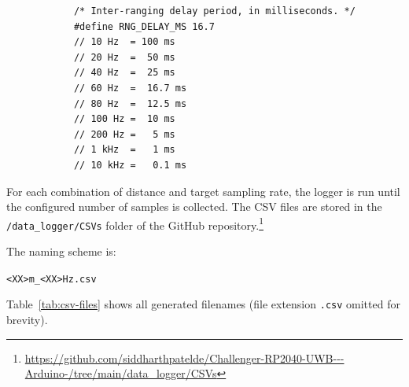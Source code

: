 \documentclass[a4paper,11pt]{article}
\begin{document}
	\begin{tcolorbox}[colback=black!2,
		sharp corners,
		boxrule=0.3pt]
		\begin{verbatim}
			/* Inter-ranging delay period, in milliseconds. */
			#define RNG_DELAY_MS 16.7
			// 10 Hz  = 100 ms
			// 20 Hz  =  50 ms
			// 40 Hz  =  25 ms
			// 60 Hz  =  16.7 ms
			// 80 Hz  =  12.5 ms
			// 100 Hz =  10 ms
			// 200 Hz =   5 ms
			// 1 kHz  =   1 ms
			// 10 kHz =   0.1 ms
		\end{verbatim}
	\end{tcolorbox}
	
	For each combination of distance and target sampling rate, the logger is run
	until the configured number of samples is collected. The CSV files are stored
	in the \texttt{/data\_logger/CSVs} folder of the GitHub repository.\footnote{\url{https://github.com/siddharthpatelde/Challenger-RP2040-UWB---Arduino-/tree/main/data_logger/CSVs}}
	
	The naming scheme is:
	
	\begin{center}
		\texttt{<XX>m\_<XX>Hz.csv}
	\end{center}
	
	Table~\ref{tab:csv-files} shows all generated filenames (file extension
	\texttt{.csv} omitted for brevity).
	
\end{document}
